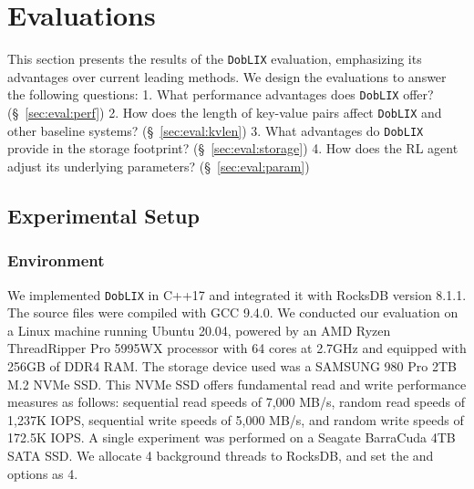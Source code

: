 \section{Evaluations}
\label{sec:eval}
This section presents the results of the \texttt{DobLIX} evaluation, emphasizing its advantages over current leading methods. We design the evaluations to answer the following questions: 1. What performance advantages does \texttt{DobLIX} offer? (\S~\ref{sec:eval:perf}) 2. How does the length of key-value pairs affect \texttt{DobLIX} and other baseline systems? (\S~\ref{sec:eval:kvlen}) 3. What advantages do \texttt{DobLIX} provide in the storage footprint? (\S~\ref{sec:eval:storage}) 4. How does the RL agent adjust its underlying parameters? (\S~\ref{sec:eval:param})


\subsection{Experimental Setup}
\label{sec:experimental_setup}

\noindent\subsubsection{\textbf{Environment}}
We implemented \texttt{DobLIX} in C++17 and integrated it with RocksDB version 8.1.1. The source files were compiled with GCC 9.4.0. We conducted our evaluation on a Linux machine running Ubuntu 20.04, powered by an AMD Ryzen ThreadRipper Pro 5995WX processor with 64 cores at 2.7GHz and equipped with 256GB of DDR4 RAM. The storage device used was a SAMSUNG 980 Pro 2TB M.2 NVMe SSD. This NVMe SSD offers fundamental read and write performance measures as follows: sequential read speeds of 7,000 MB/s, random read speeds of 1,237K IOPS, sequential write speeds of 5,000 MB/s, and random write speeds of 172.5K IOPS. A single experiment was performed on a Seagate BarraCuda 4TB SATA SSD. We allocate 4 background threads to RocksDB, and set the  and  options as 4.

